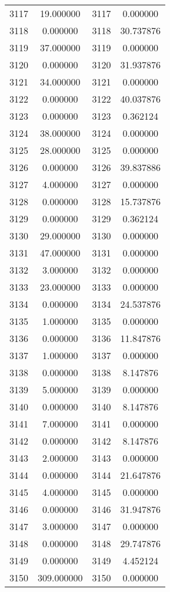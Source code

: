 \documentclass[12pt]{article}
\begin{document}
\begin{longtable}{@{}cccc@{}}
3117 & 19.000000 & 3117 & 0.000000 \\
3118 & 0.000000 & 3118 & 30.737876 \\
3119 & 37.000000 & 3119 & 0.000000 \\
3120 & 0.000000 & 3120 & 31.937876 \\
3121 & 34.000000 & 3121 & 0.000000 \\
3122 & 0.000000 & 3122 & 40.037876 \\
3123 & 0.000000 & 3123 & 0.362124 \\
3124 & 38.000000 & 3124 & 0.000000 \\
3125 & 28.000000 & 3125 & 0.000000 \\
3126 & 0.000000 & 3126 & 39.837886 \\
3127 & 4.000000 & 3127 & 0.000000 \\
3128 & 0.000000 & 3128 & 15.737876 \\
3129 & 0.000000 & 3129 & 0.362124 \\
3130 & 29.000000 & 3130 & 0.000000 \\
3131 & 47.000000 & 3131 & 0.000000 \\
3132 & 3.000000 & 3132 & 0.000000 \\
3133 & 23.000000 & 3133 & 0.000000 \\
3134 & 0.000000 & 3134 & 24.537876 \\
3135 & 1.000000 & 3135 & 0.000000 \\
3136 & 0.000000 & 3136 & 11.847876 \\
3137 & 1.000000 & 3137 & 0.000000 \\
3138 & 0.000000 & 3138 & 8.147876 \\
3139 & 5.000000 & 3139 & 0.000000 \\
3140 & 0.000000 & 3140 & 8.147876 \\
3141 & 7.000000 & 3141 & 0.000000 \\
3142 & 0.000000 & 3142 & 8.147876 \\
3143 & 2.000000 & 3143 & 0.000000 \\
3144 & 0.000000 & 3144 & 21.647876 \\
3145 & 4.000000 & 3145 & 0.000000 \\
3146 & 0.000000 & 3146 & 31.947876 \\
3147 & 3.000000 & 3147 & 0.000000 \\
3148 & 0.000000 & 3148 & 29.747876 \\
3149 & 0.000000 & 3149 & 4.452124 \\
3150 & 309.000000 & 3150 & 0.000000 \\

\end{longtable}
\end{document}
